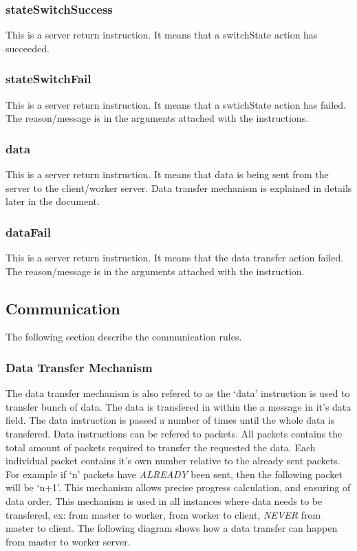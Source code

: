 \documentclass[a4paper]{article}
\begin{document}
\subsubsection{stateSwitchSuccess}
\label{protocol_inst_stateswitchsuccess}
This is a server return instruction. It means that a switchState action has
succeeded.

\subsubsection{stateSwitchFail}
\label{protocol_inst_stateswitchfail}
This is a server return instruction. It means that a swtichState action has
failed. The reason/message is in the arguments attached with the instructions.

\subsubsection{data}
\label{protocol_inst_data}
This is a server return instruction. It means that data is being sent from the
server to the client/worker server. Data transfer mechanism is explained in
details later in the document.

\subsubsection{dataFail}
\label{protocol_inst_datafail}
This is a server return instruction. It means that the data transfer action
failed. The reason/message is in the arguments attached with the instruction.

\subsection{Communication}
\label{protocol_communication}
The following section describe the communication rules.

\subsubsection{Data Transfer Mechanism}
\label{protocol_communication_data_transfer}
The data transfer mechanism is also refered to as the `data' instruction is
used to transfer bunch of data. The data is transfered in within the a message
in it's data field. The data instruction is passed a number of times until the 
whole data is transfered. Data instructions can be refered to packets. All 
packets contains the total amount of packets required to transfer the requested 
the data. Each individual packet contains it's own number relative to the
already sent packets. For example if `n' packets have \emph{ALREADY} been sent,
then the following packet will be `n+1'. This mechanism allows precise progress
calculation, and ensuring of data order. This mechanism is used in all
instances where data needs to be transfered, ex: from master to worker, from
worker to client, \emph{NEVER} from master to client. The following diagram
shows how a data transfer can happen from master to worker server.
\end{document}
